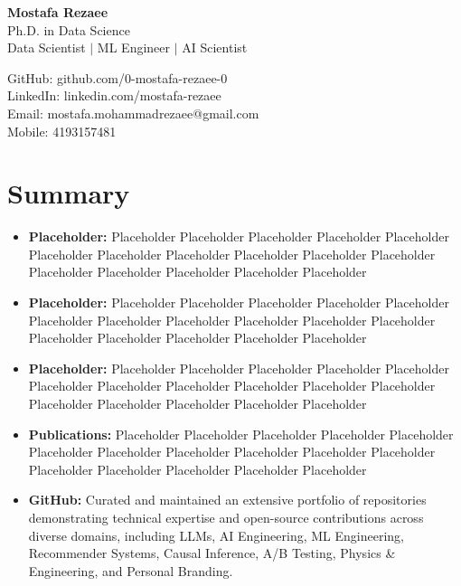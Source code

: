 \documentclass[11pt]{article} %
\begin{document}
\begin{center}
	\begin{minipage}{0.45\textwidth}
		{\Huge\bfseries
			Mostafa Rezaee  %
		} \\ \medskip
		Ph.D. in Data Science \\ %
		Data Scientist $|$ ML Engineer $|$ AI Scientist 
	\end{minipage} \hfill
	\begin{minipage}{0.48\textwidth}
		GitHub: github.com/0-mostafa-rezaee-0 \\
		LinkedIn: linkedin.com/mostafa-rezaee \\
		Email: mostafa.mohammadrezaee@gmail.com \\
		Mobile: 4193157481
	\end{minipage}
\end{center}

\section{Summary}
\begin{itemize}[itemsep=5pt]
	\item \textbf{Placeholder:} Placeholder Placeholder Placeholder Placeholder Placeholder Placeholder Placeholder Placeholder Placeholder Placeholder Placeholder Placeholder Placeholder Placeholder Placeholder Placeholder 
	\item \textbf{Placeholder:} Placeholder Placeholder Placeholder Placeholder Placeholder Placeholder Placeholder Placeholder Placeholder Placeholder Placeholder Placeholder Placeholder Placeholder Placeholder Placeholder 
	\item \textbf{Placeholder:} Placeholder Placeholder Placeholder Placeholder Placeholder Placeholder Placeholder Placeholder Placeholder Placeholder Placeholder Placeholder Placeholder Placeholder Placeholder Placeholder 
	\item \textbf{Publications:} Placeholder Placeholder Placeholder Placeholder Placeholder Placeholder Placeholder Placeholder Placeholder Placeholder Placeholder Placeholder Placeholder Placeholder Placeholder Placeholder   
	\item \textbf{GitHub:} Curated and maintained an extensive portfolio of repositories demonstrating technical expertise and open-source contributions across diverse domains, including LLMs, AI Engineering, ML Engineering, Recommender Systems, Causal Inference, A/B Testing, Physics \& Engineering, and Personal Branding.
\end{itemize}
\end{document}
